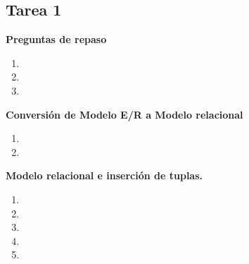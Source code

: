 \documentclass{report}
\begin{document}
	
	
	\begin{center}
		\section*{\LARGE{Tarea 1}}
	\end{center}

    \begin{center}
        \LARGE{\textbf{Preguntas de repaso}}\vspace{.3cm}
    \end{center}
    \normalsize
    \begin{enumerate}%
        \item 
        \item 
        \item 
    \end{enumerate}

    \begin{center}
        \LARGE{\textbf{Conversión de Modelo E/R a Modelo relacional  }}\vspace{.3cm}
    \end{center}
    \normalsize
    \begin{enumerate}%
        \item 
        \item 
    \end{enumerate}

    \begin{center}
        \LARGE{\textbf{Modelo relacional e inserción de tuplas.}}\vspace{.3cm}
    \end{center}
    \normalsize
    \begin{enumerate}%
        \item 
        \item 
        \item 
        \item 
        \item 
    \end{enumerate}
\end{document}
